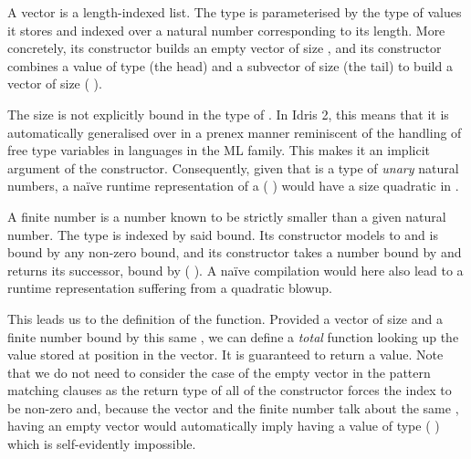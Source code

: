 \documentclass{article}
\newcommand{\idris}{Idris 2}
\begin{document}
A vector is a length-indexed list. The type  is parameterised
by the type of values it stores and indexed over a natural number corresponding
to its length.
%
More concretely, its  constructor builds an empty vector of size
, and its \IdrisData{(::)} constructor combines a
value of type  (the head) and a subvector of size 
(the tail) to build a vector of size ( \IdrisFunction{+} ).


The size  is not explicitly bound in the type of \IdrisData{(::)}.
In \idris{}, this means that it is automatically generalised over in a prenex
manner reminiscent of the handling of free type variables in languages in the
ML family.
%
This makes it an implicit argument of the constructor. Consequently, given that
 is a type of \emph{unary} natural numbers, a naïve runtime
representation of a {(  )} would
have a size quadratic in .

A finite number is a number known to be strictly smaller than a given natural
number. The type  is indexed by said bound.
%
Its  constructor models to  and is bound by any
non-zero bound, and its  constructor takes a number bound by
 and returns its successor, bound by
( \IdrisFunction{+} ).
%
A naïve compilation would here also lead to a runtime representation suffering
from a quadratic blowup.


This leads us to the definition of the  function. Provided
a vector of size  and a finite number bound by this same ,
we can define a \emph{total} function looking up the value stored at position in the
vector. It is guaranteed to return a value.
%
Note that we do not need to consider the case of the empty vector in the pattern
matching clauses as the return type of all of the  constructor forces
the index to be non-zero and, because the vector and the finite number talk about the
same , having an empty vector would automatically imply having a value
of type ( ) which is self-evidently impossible.

\end{document}
